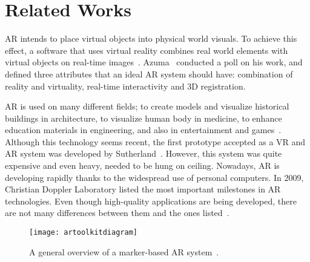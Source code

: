 \section{Related Works}
AR intends to place virtual objects into physical world visuals. To achieve this effect, a software that uses virtual reality combines real world elements with virtual objects on real-time images~\cite{Cawood2008}. Azuma~\cite{azuma1997survey} conducted a poll on his work, and defined three attributes that an ideal AR system should have: combination of reality and virtuality, real-time interactivity and 3D registration.

AR is used on many different fields; to create models and visualize historical buildings in architecture, to visualize human body in medicine, to enhance education materials in engineering, and also in entertainment and games~\cite{azuma1997survey,Broschart2014}. Although this technology seems recent, the first prototype accepted as a VR and AR system was developed by Sutherland~\cite{Sutherland1968}. However, this system was quite expensive and even heavy, needed to be hung on ceiling. Nowadays, AR is developing rapidly thanks to the widespread use of personal computers. In 2009, Christian Doppler Laboratory listed the most important milestones in AR technologies. Even though high-quality applications are being developed, there are not many differences between them and the ones listed~\cite{Doppler}.
\begin{figure*}[t]
  \centering
  \texttt{[image: artoolkitdiagram]}
  \caption{ \label{fig:arsystem}
          A general overview of a marker-based AR system~\cite{ARToolKit}.
           }
\end{figure*}